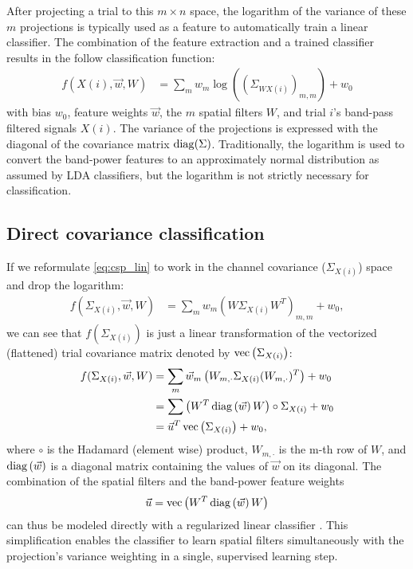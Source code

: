 After projecting a trial to this $m \times n$ space, the logarithm of the
variance of these $m$ projections is typically used as a feature to
automatically train a linear classifier. 
The combination of the feature extraction and a trained classifier results in the follow classification function:
%
\begin{align} \label{eq:csp_lin}
  f(X(i), \vec{w}, W) 
  &= \sum_m w_m \log\left(
    \left(\Sigma_{WX(i)}\right)_{m,m}
    \right) + w_0
\end{align}
with bias $w_0$, feature weights $\vec{w}$, the $m$ spatial filters $W$, and
trial $i$'s band-pass filtered signals $X(i)$. 
%
The variance of the projections is expressed with the diagonal of the
covariance matrix $\operatorname{diag}(\Sigma)$.
%
Traditionally, the logarithm is used to convert the
band-power features to an approximately normal distribution as assumed by
\ac{LDA} classifiers, but the logarithm is not strictly necessary for classification.

\subsection{Direct covariance classification}
\begin{sloppypar}
If we reformulate \eqref{eq:csp_lin} to work in the channel
covariance ($\Sigma_{X(i)}$) space and drop the logarithm:
\begin{align}
  f(\Sigma_{X(i)}, \vec{w}, W) 
  &= \sum_m w_m \left(W\Sigma_{X(i)}W^T\right)_{m,m} + w_0,
\end{align}
%
we can see that $f(\Sigma_{X(i)})$ is just a linear transformation of the
vectorized (flattened) trial covariance matrix denoted by $\operatorname{vec}
\left(\Sigma_{X(i)}\right)$:
%
\begin{align}
  f(\Sigma_{X(i)}, \vec{w}, W) 
  &= \sum_m \vec{w}_m \left(W_{m,\cdot}\Sigma_{X(i)}(W_{m,\cdot})^T\right) + w_0
\\
  &= \sum \left(W^T \operatorname{diag}\left(\vec{w}\right) W\right) \circ \Sigma_{X(i)} + w_0
  \label{eq:filter_fac}
\\
  &= \vec{u}^T \operatorname{vec}\left(\Sigma_{X(i)}\right) + w_0,
  \label{eq:implicit_sf}
\end{align}
where $\circ$ is the Hadamard (element wise) product, $W_{m,\cdot}$ is the m-th
row of $W$, and $\operatorname{diag}\left(\vec{w}\right)$ is a diagonal matrix containing the
values of $\vec{w}$ on its diagonal.
%
The combination of the spatial filters and the band-power feature weights
\begin{align}
  \vec{u} = \operatorname{vec} \left(W^T\operatorname{diag}\left(\vec{w}\right)W\right)
\end{align}
can thus be modeled directly with a regularized linear classifier
\cite{farquhar2009lfs}. This simplification enables the classifier to learn
spatial filters simultaneously with the projection's variance weighting in a
single, supervised learning step. 
\end{sloppypar}

